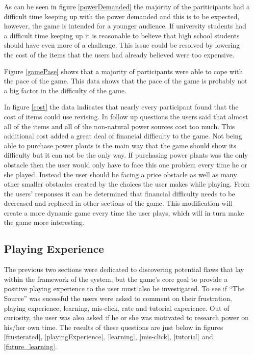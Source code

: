 \documentclass[msc,oneside]{ubcthesis}%
\begin{document}
As can be seen in figure \ref{powerDemanded} the majority of the pariticipants had a difficult time keeping up with the power demanded and this is to be expected, however, the game is intended for a younger audience. If university students had a difficult time keeping up it is reasonable to believe that high school students should have even more of a challenge. This issue could be resolved by lowering the cost of the items that the users had already believed were too expensive.

Figure \ref{gamePase} shows that a majority of participants were able to cope with the pace of the game. This data shows that the pace of the game is probably not a big factor in the difficulty of the game. 

\newpage
In figure \ref{cost} the data indicates that nearly every participant found that the cost of items could use revising. In follow up questions the users said that almost all of the items and all of the non-natural power sources cost too much. This additional cost added a great deal of financial difficulty to the game. Not being able to purchase power plants is the main way that the game should show its difficulty but it can not be the only way. If purchasing power plants was the only obstacle then the user would only have to face this one problem every time he or she played. Instead the user should be facing a price obstacle as well as many other smaller obstacles created by the choices the user makes while playing. From the users' responses it can be determined that financial difficulty needs to be decreased and replaced in other sections of the game. This modification will create a more dynamic game every time the user plays, which will in turn make the game more interesting.



\subsection{Playing Experience}
\indent The previous two sections were dedicated to discovering potential flaws that lay within the framework of the system, but the game's core goal to provide a positive playing experience to the user must also be investigated. To see if ``The Source'' was sucessful the users were asked to comment on their frustration, playing experience, learning, mis-click, rate and tutorial experience. Out of curiosity, the user was also asked if he or she was motivated to research power on his/her own time. The results of these questions are just below in figures \ref{frusterated}, \ref{playingExperience}, \ref{learning}, \ref{mis-click}, \ref{tutorial} and \ref{future_learning}. 
\end{document}
